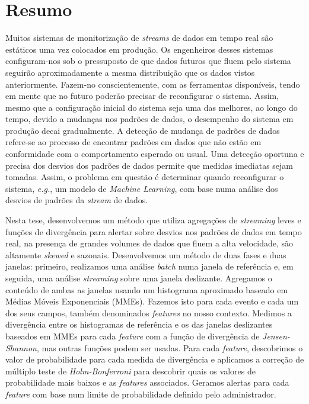\chapter*{Resumo}
Muitos sistemas de monitorização de \textit{streams} de dados em tempo real são estáticos uma vez colocados em produção. Os engenheiros desses sistemas configuram-nos sob o pressuposto de que dados futuros que fluem pelo sistema seguirão aproximadamente a mesma distribuição que os dados vistos anteriormente. Fazem-no conscientemente, com as ferramentas disponíveis, tendo em mente que no futuro poderão precisar de reconfigurar o sistema. Assim, mesmo que a configuração inicial do sistema seja uma das melhores, ao longo do tempo, devido a mudanças nos padrões de dados, o desempenho do sistema em produção decai gradualmente. A detecção de mudança de padrões de dados refere-se ao processo de encontrar padrões em dados que não estão em conformidade com o comportamento esperado ou usual. Uma detecção oportuna e precisa dos desvios dos padrões de dados permite que medidas imediatas sejam tomadas. Assim, o problema em questão é determinar quando reconfigurar o sistema, \textit{e.g.}, um modelo de \textit{Machine Learning}, com base numa análise dos desvios de padrões da \textit{stream} de dados.

Nesta tese, desenvolvemos um método que utiliza agregações de \textit{streaming} leves e funções de divergência para alertar sobre desvios nos padrões de dados em tempo real, na presença de grandes volumes de dados que fluem a alta velocidade, são altamente \textit{skewed} e sazonais. Desenvolvemos um método de duas fases e duas janelas: primeiro, realizamos uma análise \textit{batch} numa janela de referência e, em seguida, uma análise \textit{streaming} sobre uma janela deslizante. Agregamos o conteúdo de ambas as janelas usando um histograma aproximado baseado em Médias Móveis Exponenciais (MMEs). Fazemos isto para cada evento e cada um dos seus campos, também denominados \textit{features} no nosso contexto. Medimos a divergência entre os histogramas de referência e os das janelas deslizantes baseados em MMEs para cada \textit{feature} com a função de divergência de \textit{Jensen-Shannon}, mas outras funções podem ser usadas. Para cada \textit{feature}, descobrimos o valor de probabilidade para cada medida de divergência e aplicamos a correção de múltiplo teste de \textit{Holm-Bonferroni} para descobrir quais os valores de probabilidade mais baixos e as \textit{features} associados. Geramos alertas  para cada \textit{feature} com base num limite de probabilidade definido pelo administrador.

